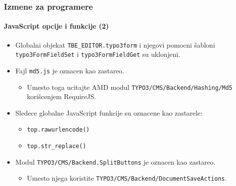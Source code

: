 \begin{frame}[fragile]
	\frametitle{Izmene za programere}
	\framesubtitle{JavaScript opcije i funkcije (2)}

	\begin{itemize}

		\item Globalni objekat \texttt{TBE\_EDITOR.typo3form} i njegovi pomocni šabloni \texttt{typo3FormFieldSet}
			i \texttt{typo3FormFieldGet} su uklonjeni.

		\item Fajl \texttt{md5.js} je oznacen kao zastareo.

			\begin{itemize}\smaller
				\item[\ding{228}] Umesto toga ucitajte AMD modul \texttt{TYPO3/CMS/Backend/Hashing/Md5} korišcenjem RequireJS.
			\end{itemize}\normalsize

		\item Sledece globalne JavaScript funkcije su oznacene kao zastarele:

		\begin{itemize}
			\item \texttt{top.rawurlencode()}
			\item \texttt{top.str\_replace()}
		\end{itemize}

		\item Modul \texttt{TYPO3/CMS/Backend.SplitButtons} je oznacen kao zastareo.

			\begin{itemize}\smaller
				\item[\ding{228}] Umesto njega koristite \texttt{TYPO3/CMS/Backend/DocumentSaveActions}.
			\end{itemize}\normalsize

 	\end{itemize}

\end{frame}


